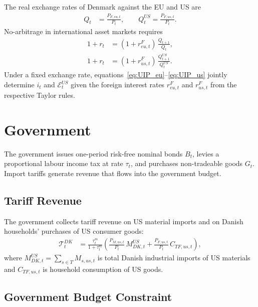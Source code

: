 \documentclass[12pt,a4paper]{article}
\begin{document}
The real exchange rates of Denmark against the EU and US are
\begin{align}
    Q_t &= \frac{P_{F,eu,t}}{P_t}, \qquad
    Q^{US}_t = \frac{P_{F,us,t}}{P_t}.
    \label{eq:RER}
\end{align}
No-arbitrage in international asset markets requires
\begin{align}
    1+r_t &= (1+r^F_{eu,t})\,\frac{Q_{t+1}}{Q_t},
    \label{eq:UIP_eu}\\
    1+r_t &= (1+r^F_{us,t})\,\frac{Q^{US}_{t+1}}{Q^{US}_t}.
    \label{eq:UIP_us}
\end{align}
Under a fixed exchange rate, equations~\eqref{eq:UIP_eu}--\eqref{eq:UIP_us} jointly determine $i_t$ and $\mathcal{E}^{US}_t$ given the foreign interest rates $r^F_{eu,t}$ and $r^F_{us,t}$ from the respective Taylor rules.


\section{Government}
\label{sec:govt}

The government issues one-period risk-free nominal bonds $B_t$, levies a proportional labour income tax at rate $\tau_t$, and purchases non-tradeable goods $G_t$. Import tariffs generate revenue that flows into the government budget.

\subsection{Tariff Revenue}

The government collects tariff revenue on US material imports and on Danish households' purchases of US consumer goods:
\begin{align}
    \mathcal{T}^{DK}_t &= \frac{\tau^m_t}{1+\tau^m_t}
        \left(\frac{P_{M,us,t}}{P_t}\,M^{US}_{DK,t}
        + \frac{P_{F,us,t}}{P_t}\,C_{TF,us,t}\right),
    \label{eq:tariff_rev}
\end{align}
where $M^{US}_{DK,t} = \sum_{s\in T} M_{s,us,t}$ is total Danish industrial imports of US materials and $C_{TF,us,t}$ is household consumption of US goods.

\subsection{Government Budget Constraint}
\end{document}
